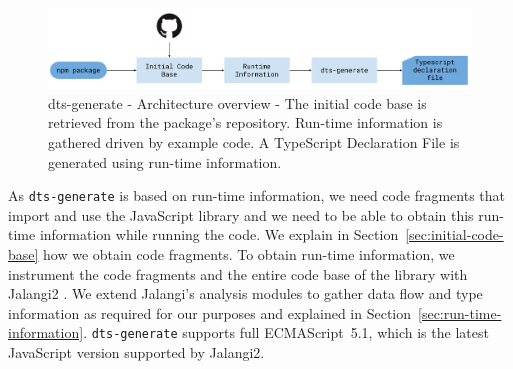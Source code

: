 \documentclass[sigconf]{acmart}
\begin{document}

\begin{figure}[tp]
  \centering
  \includegraphics[width=1\linewidth]{dts-generate-block-diagram.pdf}
  \caption[dts-generate - Architecture overview]{dts-generate - Architecture
      overview - The initial code base is retrieved from the \NPM{} package's
    repository.
    Run-time information is gathered driven by example code.
    A TypeScript Declaration File is generated using run-time
    information.
  } 
  \label{fig:tsd_generation_method_block_diagram}
\end{figure}

As \texttt{dts-generate} is based on run-time information, we need code
fragments that import and use the JavaScript library and we need to be
able to obtain this run-time information while running the code.
We explain in Section~\ref{sec:initial-code-base} how we obtain code
fragments. 
To obtain run-time information, we instrument
the code fragments and the entire code base of the library with
Jalangi2 \cite{DBLP:conf/sigsoft/SenKBG13}. We extend Jalangi's
analysis modules to gather data flow and type information as required
for our purposes and explained in
Section~\ref{sec:run-time-information}.
\texttt{dts-generate} supports full ECMAScript~5.1, which is
the latest JavaScript version supported by Jalangi2. 
\end{document}
